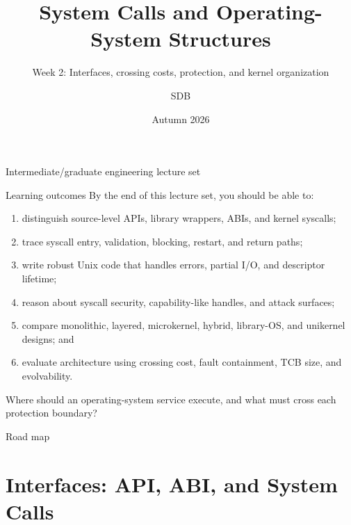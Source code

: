 \documentclass[aspectratio=169,11pt]{beamer}
\title[OS Interfaces and Structures]{System Calls and Operating-System Structures}
\subtitle{Week 2: Interfaces, crossing costs, protection, and kernel organization}
\author[SDB]{SDB}
\date{Autumn 2026}
\begin{document}
\begin{frame}
  \titlepage
  \vspace{-1.2em}
  \begin{center}
    \small Intermediate/graduate engineering lecture set
  \end{center}
\end{frame}

\begin{frame}{Learning outcomes}
  By the end of this lecture set, you should be able to:
  \begin{enumerate}
    \item distinguish source-level APIs, library wrappers, ABIs, and kernel syscalls;
    \item trace syscall entry, validation, blocking, restart, and return paths;
    \item write robust Unix code that handles errors, partial I/O, and descriptor lifetime;
    \item reason about syscall security, capability-like handles, and attack surfaces;
    \item compare monolithic, layered, microkernel, hybrid, library-OS, and unikernel designs; and
    \item evaluate architecture using crossing cost, fault containment, TCB size, and evolvability.
  \end{enumerate}
  \begin{tcolorbox}[title=Guiding question,colback=osorange!5,colframe=osorange!70]
    Where should an operating-system service execute, and what must cross each protection boundary?
  \end{tcolorbox}
\end{frame}

\begin{frame}{Road map}
  \tableofcontents
\end{frame}

\section{Interfaces: API, ABI, and System Calls}
\end{document}
